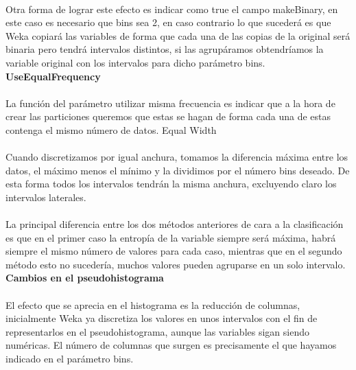 \documentclass[es]{ifirak}
\begin{document}
\paragraph{}
Otra forma de lograr este efecto es indicar como true el campo makeBinary, en este caso es necesario que bins sea 2, en caso contrario lo que sucederá es que Weka copiará las variables de forma que cada una de las copias de la original será binaria pero tendrá intervalos distintos, si las agrupáramos obtendríamos la variable original con los intervalos para dicho parámetro bins.\\

\textbf{UseEqualFrequency}
\paragraph{}
La función del parámetro utilizar misma frecuencia es indicar que a la hora de  crear las particiones queremos que estas se hagan de forma cada una de estas contenga el mismo número de datos.
Equal Width
\paragraph{}
Cuando discretizamos por igual anchura, tomamos la diferencia máxima entre los datos, el máximo menos el mínimo y la dividimos por el número bins deseado. De esta forma todos los intervalos tendrán la misma anchura, excluyendo claro los intervalos laterales.
\paragraph{}
La principal diferencia entre los dos métodos anteriores de cara a la clasificación es que en el primer caso la entropía de la variable siempre será máxima, habrá siempre el mismo número de valores para cada caso, mientras que en el segundo método esto no sucedería, muchos valores pueden agruparse en un solo intervalo.\\

\textbf{Cambios en el pseudohistograma}
\paragraph{}
El efecto que se aprecia en el histograma es la reducción de columnas, inicialmente Weka ya discretiza los valores en unos intervalos con el fin de representarlos en el pseudohistograma, aunque las variables sigan siendo numéricas. El número de columnas que surgen es precisamente el que hayamos indicado en el parámetro bins.\\
\end{document}
